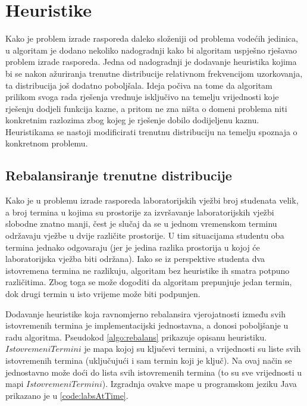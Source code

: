 \documentclass[times, utf8, zavrsni]{fer}
\begin{document}
\section{Heuristike}
\label{sec:heuristike}
Kako je problem izrade rasporeda daleko složeniji od problema vodećih jedinica, u algoritam je dodano nekoliko nadogradnji
kako bi algoritam uspješno rješavao problem izrade rasporeda. Jedna od nadogradnji je dodavanje heuristika kojima bi
se nakon ažuriranja trenutne distribucije relativnom frekvencijom uzorkovanja, ta distribucija još dodatno poboljšala.
Ideja počiva na tome da algoritam prilikom svoga rada rješenja vrednuje isključivo na temelju vrijednosti koje rješenju
dodjeli funkcija kazne, a pritom ne zna ništa o domeni problema niti konkretnim razlozima zbog kojeg je rješenje dobilo
dodijeljenu kaznu. Heuristikama se nastoji modificirati trenutnu distribuciju na temelju spoznaja o konkretnom problemu.

\subsection{Rebalansiranje trenutne distribucije}
\label{sec:rebalans}
Kako je u problemu izrade rasporeda laboratorijskih vježbi broj studenata velik, a broj termina u kojima su prostorije
za izvršavanje laboratorijskih vježbi slobodne znatno manji, čest je slučaj da se u jednom vremenskom terminu održavaju vježbe u dvije
različite prostorije. U tim situacijama studentu oba termina jednako odgovaraju (jer je jedina razlika prostorija u kojoj
će laboratorijska vježba biti održana). Iako se iz perspektive studenta dva istovremena termina ne razlikuju, algoritam
bez heuristike ih smatra potpuno različitima. Zbog toga se može dogoditi da algoritam prepunjuje jedan termin, dok drugi termin
u isto vrijeme može biti podpunjen.

Dodavanje heuristike koja ravnomjerno rebalansira vjerojatnosti između svih istovremenih
termina je implementacijski jednostavna, a donosi poboljšanje u radu algoritma. Pseudokod \ref{algo:rebalans} prikazuje opisanu heuristiku.
$IstovremeniTermini$ je mapa kojoj su ključevi termini, a vrijednosti su liste svih istovremenih termina
(uključujući i sam termin koji je ključ). Na ovaj način se jednostavno može doći do lista svih istovremenih termina (to su sve vrijednosti
u mapi $IstovremeniTermini$). Izgradnja ovakve mape u programskom jeziku Java prikazano je u \ref{code:labsAtTime}.
\end{document}
